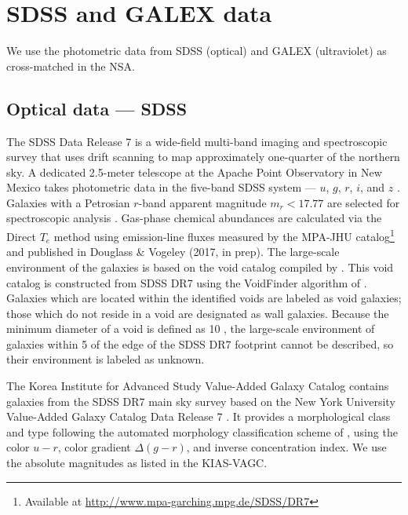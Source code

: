
\section[Data]{SDSS and GALEX data}

We use the photometric data from SDSS (optical) and GALEX (ultraviolet) as 
cross-matched in the NSA.

\subsection{Optical data --- SDSS}\label{sec:SDSS}

The SDSS Data Release 7 \citep[DR7]{Abazajian09} is a wide-field multi-band 
imaging and spectroscopic survey that uses drift scanning to map approximately 
one-quarter of the northern sky.  A dedicated 2.5-meter telescope at the Apache 
Point Observatory in New Mexico takes photometric data in the five-band SDSS 
system --- $u$, $g$, $r$, $i$, and $z$ \citep{Fukugita96,Gunn98}.  Galaxies with 
a Petrosian $r$-band apparent magnitude $m_r < 17.77$ are selected for 
spectroscopic analysis \citep{Lupton01,Strauss02}.  Gas-phase chemical 
abundances are calculated via the Direct $T_e$ method using emission-line fluxes 
measured by the MPA-JHU catalog\footnote{Available at 
\url{http://www.mpa-garching.mpg.de/SDSS/DR7}} and published in Douglass \& 
Vogeley (2017, in prep).  The large-scale environment of the galaxies is based 
on the void catalog compiled by \cite{Pan12}.  This void catalog is constructed 
from SDSS DR7 using the VoidFinder algorithm of \cite{Hoyle02}.  Galaxies which 
are located within the identified voids are labeled as void galaxies; those 
which do not reside in a void are designated as wall galaxies.  Because the 
minimum diameter of a void is defined as 10 \hMpc , the large-scale environment 
of galaxies within 5 \hMpc of the edge of the SDSS DR7 footprint cannot be 
described, so their environment is labeled as unknown.

The Korea Institute for Advanced Study Value-Added Galaxy Catalog 
\citep[KIAS-VAGC]{Choi10} contains galaxies from the SDSS DR7 main sky survey 
based on the New York University Value-Added Galaxy Catalog Data Release 7 
\citep[NYU-VAGC]{Blanton05}.  It provides a morphological class and type 
following the automated morphology classification scheme of \cite{Park05}, using 
the color $u-r$, color gradient $\Delta (g-r)$, and inverse concentration index.  
We use the absolute magnitudes as listed in the KIAS-VAGC.

